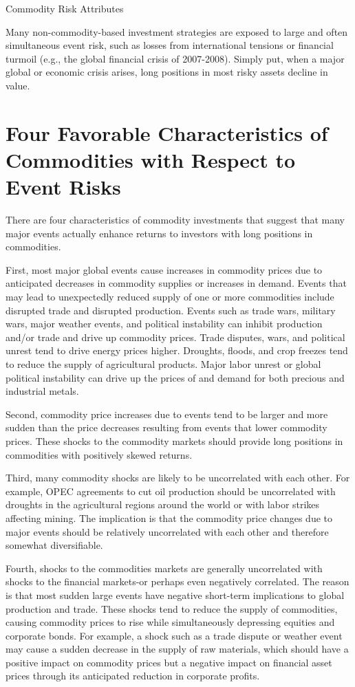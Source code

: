 \documentclass[11pt]{article}
\begin{document}
Commodity Risk Attributes

Many non-commodity-based investment strategies are exposed to large and often simultaneous event risk, such as losses from international tensions or financial turmoil (e.g., the global financial crisis of 2007-2008). Simply put, when a major global or economic crisis arises, long positions in most risky assets decline in value.

\section*{Four Favorable Characteristics of Commodities with Respect to Event Risks}
There are four characteristics of commodity investments that suggest that many major events actually enhance returns to investors with long positions in commodities.

First, most major global events cause increases in commodity prices due to anticipated decreases in commodity supplies or increases in demand. Events that may lead to unexpectedly reduced supply of one or more commodities include disrupted trade and disrupted production. Events such as trade wars, military wars, major weather events, and political instability can inhibit production and/or trade and drive up commodity prices. Trade disputes, wars, and political unrest tend to drive energy prices higher. Droughts, floods, and crop freezes tend to reduce the supply of agricultural products. Major labor unrest or global political instability can drive up the prices of and demand for both precious and industrial metals.

Second, commodity price increases due to events tend to be larger and more sudden than the price decreases resulting from events that lower commodity prices. These shocks to the commodity markets should provide long positions in commodities with positively skewed returns.

Third, many commodity shocks are likely to be uncorrelated with each other. For example, OPEC agreements to cut oil production should be uncorrelated with droughts in the agricultural regions around the world or with labor strikes affecting mining. The implication is that the commodity price changes due to major events should be relatively uncorrelated with each other and therefore somewhat diversifiable.

Fourth, shocks to the commodities markets are generally uncorrelated with shocks to the financial markets-or perhaps even negatively correlated. The reason is that most sudden large events have negative short-term implications to global production and trade. These shocks tend to reduce the supply of commodities, causing commodity prices to rise while simultaneously depressing equities and corporate bonds. For example, a shock such as a trade dispute or weather event may cause a sudden decrease in the supply of raw materials, which should have a positive impact on commodity prices but a negative impact on financial asset prices through its anticipated reduction in corporate profits.
\end{document}
